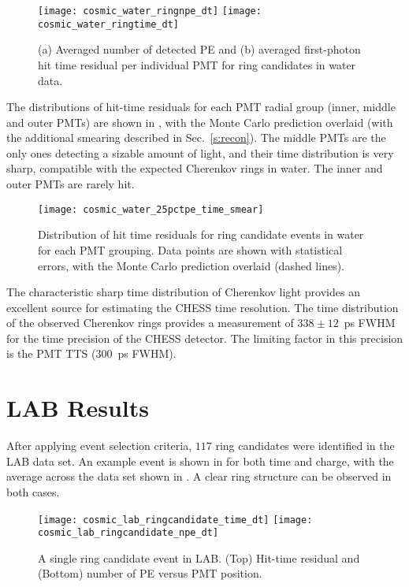 \begin{figure}
	\centering
	\texttt{[image: cosmic\_water\_ringnpe\_dt]}
	\texttt{[image: cosmic\_water\_ringtime\_dt]}
	\caption{(a) Averaged number of detected PE and (b) averaged first-photon hit time residual per individual PMT for ring candidates in water data.}
	\label{fig:cosmics_water_npes}
\end{figure}


The  distributions of hit-time residuals for each PMT radial group (inner, middle and outer PMTs) are shown in , with the Monte Carlo prediction overlaid (with the additional smearing described in Sec.~\ref{s:recon}). 
The middle PMTs are the only ones detecting a sizable amount of light, and their time distribution is very sharp, compatible with the expected Cherenkov rings in water. The inner and outer PMTs are rarely hit. 


\begin{figure}
	\centering
	\texttt{[image: cosmic\_water\_25pctpe\_time\_smear]}
	\caption{Distribution of hit time residuals for ring candidate events in water for each PMT grouping. Data points are shown with statistical errors, with the Monte Carlo prediction overlaid (dashed lines). }
	\label{fig:cosmics_water}
\end{figure}


The characteristic sharp time distribution of  Cherenkov light provides an excellent source for estimating the CHESS time resolution. The time distribution of the observed Cherenkov rings provides a measurement of $338\pm 12$~ps FWHM for the time precision of the CHESS detector. The limiting factor in this precision is the PMT TTS (300~ps FWHM). 

\section{LAB Results}

After applying event selection criteria, $117$ ring candidates were identified in the LAB data set. An example event is shown in  for both time and charge, with the average across the data set shown in . A clear ring structure can be observed in both cases. 

\begin{figure}[!t]
	\centering
	\texttt{[image: cosmic\_lab\_ringcandidate\_time\_dt]}
	\texttt{[image: cosmic\_lab\_ringcandidate\_npe\_dt]}
	\caption{A single ring candidate event in LAB. (Top) Hit-time residual and (Bottom) number of PE versus PMT position.}
	\label{fig:lab_ring}
\end{figure}

